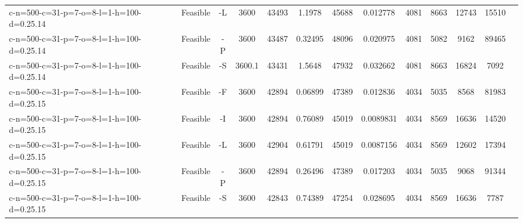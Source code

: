 \documentclass[landscape, a4paper]{article}
\begin{document}
\begin{center}
\begin{tabular}{lcccccccccccc}
c-n=500-c=31-p=7-o=8-l=1-h=100-d=0.25.14 & Feasible & -L & 3600 & 43493 & 1.1978 & 45688 & 0.012778 & 4081 & 8663 & 12743 & 15510 & \\
c-n=500-c=31-p=7-o=8-l=1-h=100-d=0.25.14 & Feasible & -P & 3600 & 43487 & 0.32495 & 48096 & 0.020975 & 4081 & 5082 & 9162 & 89465 & \\
c-n=500-c=31-p=7-o=8-l=1-h=100-d=0.25.14 & Feasible & -S & 3600.1 & 43431 & 1.5648 & 47932 & 0.032662 & 4081 & 8663 & 16824 & 7092 & \\
c-n=500-c=31-p=7-o=8-l=1-h=100-d=0.25.15 & Feasible & -F & 3600 & 42894 & 0.06899 & 47389 & 0.012836 & 4034 & 5035 & 8568 & 81983 & \\
c-n=500-c=31-p=7-o=8-l=1-h=100-d=0.25.15 & Feasible & -I & 3600 & 42894 & 0.76089 & 45019 & 0.0089831 & 4034 & 8569 & 16636 & 14520 & \\
c-n=500-c=31-p=7-o=8-l=1-h=100-d=0.25.15 & Feasible & -L & 3600 & 42904 & 0.61791 & 45019 & 0.0087156 & 4034 & 8569 & 12602 & 17394 & \\
c-n=500-c=31-p=7-o=8-l=1-h=100-d=0.25.15 & Feasible & -P & 3600 & 42894 & 0.26496 & 47389 & 0.017203 & 4034 & 5035 & 9068 & 91344 & \\
c-n=500-c=31-p=7-o=8-l=1-h=100-d=0.25.15 & Feasible & -S & 3600 & 42843 & 0.74389 & 47254 & 0.028695 & 4034 & 8569 & 16636 & 7787 & \\
\end{tabular}
\end{center}
\end{document}
